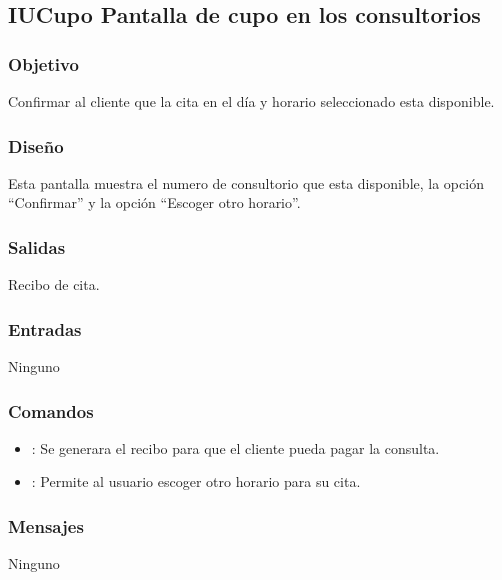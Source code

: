 \subsection{IUCupo Pantalla de cupo en los consultorios}

\subsubsection{Objetivo}
	Confirmar al cliente que la cita en el d\'ia y horario seleccionado esta disponible.

\subsubsection{Diseño}
	Esta pantalla muestra el numero de consultorio que esta disponible, la opci\'on "`Confirmar"' y la opci\'on "`Escoger otro horario"'.

    
\subsubsection{Salidas}
    Recibo de cita.

\subsubsection{Entradas}
	Ninguno

\subsubsection{Comandos}
\begin{itemize}
		\item {}: Se generara el recibo para que el cliente pueda pagar la consulta.
		\item {}: Permite al usuario escoger otro horario para su cita.
\end{itemize}

\subsubsection{Mensajes}
	Ninguno